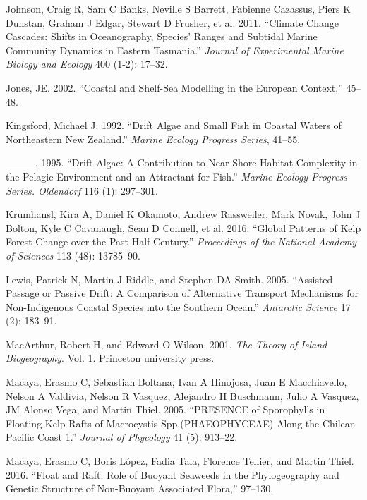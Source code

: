 \documentclass[
]{article}
\begin{document}
\leavevmode\hypertarget{ref-Johnson2011}{}%
Johnson, Craig R, Sam C Banks, Neville S Barrett, Fabienne Cazassus,
Piers K Dunstan, Graham J Edgar, Stewart D Frusher, et al. 2011.
``Climate Change Cascades: Shifts in Oceanography, Species' Ranges and
Subtidal Marine Community Dynamics in Eastern Tasmania.'' \emph{Journal
of Experimental Marine Biology and Ecology} 400 (1-2): 17--32.

\leavevmode\hypertarget{ref-Jones2002}{}%
Jones, JE. 2002. ``Coastal and Shelf-Sea Modelling in the European
Context,'' 45--48.

\leavevmode\hypertarget{ref-kingsford1992}{}%
Kingsford, Michael J. 1992. ``Drift Algae and Small Fish in Coastal
Waters of Northeastern New Zealand.'' \emph{Marine Ecology Progress
Series}, 41--55.

\leavevmode\hypertarget{ref-kingsford1995}{}%
---------. 1995. ``Drift Algae: A Contribution to Near-Shore Habitat
Complexity in the Pelagic Environment and an Attractant for Fish.''
\emph{Marine Ecology Progress Series. Oldendorf} 116 (1): 297--301.

\leavevmode\hypertarget{ref-Krumhansl2016}{}%
Krumhansl, Kira A, Daniel K Okamoto, Andrew Rassweiler, Mark Novak, John
J Bolton, Kyle C Cavanaugh, Sean D Connell, et al. 2016. ``Global
Patterns of Kelp Forest Change over the Past Half-Century.''
\emph{Proceedings of the National Academy of Sciences} 113 (48):
13785--90.

\leavevmode\hypertarget{ref-lewis2005}{}%
Lewis, Patrick N, Martin J Riddle, and Stephen DA Smith. 2005.
``Assisted Passage or Passive Drift: A Comparison of Alternative
Transport Mechanisms for Non-Indigenous Coastal Species into the
Southern Ocean.'' \emph{Antarctic Science} 17 (2): 183--91.

\leavevmode\hypertarget{ref-macarthur2001}{}%
MacArthur, Robert H, and Edward O Wilson. 2001. \emph{The Theory of
Island Biogeography}. Vol. 1. Princeton university press.

\leavevmode\hypertarget{ref-macaya2005}{}%
Macaya, Erasmo C, Sebastian Boltana, Ivan A Hinojosa, Juan E
Macchiavello, Nelson A Valdivia, Nelson R Vasquez, Alejandro H
Buschmann, Julio A Vasquez, JM Alonso Vega, and Martin Thiel. 2005.
``PRESENCE of Sporophylls in Floating Kelp Rafts of Macrocystis
Spp.(PHAEOPHYCEAE) Along the Chilean Pacific Coast 1.'' \emph{Journal of
Phycology} 41 (5): 913--22.

\leavevmode\hypertarget{ref-macaya2016}{}%
Macaya, Erasmo C, Boris López, Fadia Tala, Florence Tellier, and Martin
Thiel. 2016. ``Float and Raft: Role of Buoyant Seaweeds in the
Phylogeography and Genetic Structure of Non-Buoyant Associated Flora,''
97--130.
\end{document}
